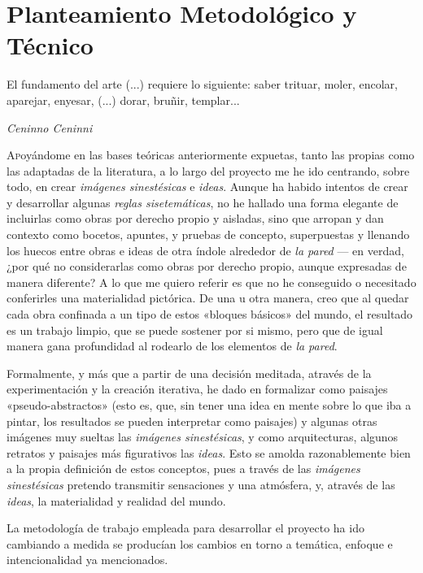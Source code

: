 \documentclass[twoside]{article}
\begin{document}
\newpage
\hypertarget{planteamiento-metodoluxf3gico}{%
  \section{Planteamiento
    Metodológico y Técnico}\label{planteamiento-metodoluxf3gico}}
\epigraph{El fundamento del arte (...) requiere lo siguiente: saber trituar, moler, encolar, aparejar, enyesar, (...) dorar, bruñir, templar...}{\textit{Ceninno Ceninni}}
\begin{multicols}{2}

  \lettrine[nindent=0em,lines=3]{A}poyándome en las bases teóricas anteriormente expuetas, tanto las
  propias como las adaptadas de la literatura, a lo largo del proyecto me
  he ido centrando, sobre todo, en crear \emph{imágenes sinestésicas} e
  \emph{ideas}. Aunque ha habido intentos de crear y desarrollar algunas
  \emph{reglas sisetemáticas}, no he hallado una forma elegante de
  incluirlas como obras por derecho propio y aisladas, sino que arropan y
  dan contexto como bocetos, apuntes, y pruebas de concepto, superpuestas
  y llenando los huecos entre obras e ideas de otra índole alrededor de
  \emph{la pared} --- en verdad, ¿por qué no considerarlas como obras por
  derecho propio, aunque expresadas de manera diferente? A lo que me
  quiero referir es que no he conseguido o necesitado conferirles una
  materialidad pictórica. De una u otra manera, creo que al quedar cada
  obra confinada a un tipo de estos «bloques básicos» del mundo, el
  resultado es un trabajo limpio, que se puede sostener por si mismo, pero
  que de igual manera gana profundidad al rodearlo de los elementos de
  \emph{la pared}.

  Formalmente, y más que a partir de una decisión meditada, através de la
  experimentación y la creación iterativa, he dado en formalizar como
  paisajes «pseudo-abstractos» (esto es, que, sin tener una idea en mente
  sobre lo que iba a pintar, los resultados se pueden interpretar como
  paisajes) y algunas otras imágenes muy sueltas las \emph{imágenes
    sinestésicas}, y como arquitecturas, algunos retratos y paisajes más
  figurativos las \emph{ideas}. Esto se amolda razonablemente bien a la
  propia definición de estos conceptos, pues a través de las
  \emph{imágenes sinestésicas} pretendo transmitir sensaciones y una
  atmósfera, y, através de las \emph{ideas}, la materialidad y realidad
  del mundo.

  La metodología de trabajo empleada para desarrollar el proyecto ha ido
  cambiando a medida se producían los cambios en torno a temática, enfoque
  e intencionalidad ya mencionados.


\end{multicols}
\end{document}
